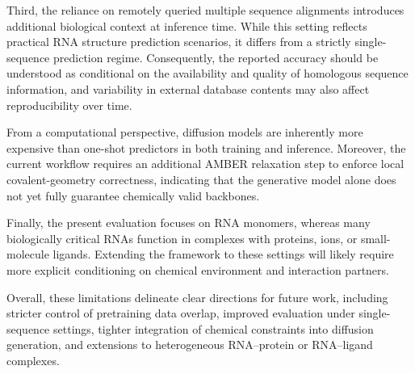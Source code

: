 Third, the reliance on remotely queried multiple sequence alignments introduces additional biological context at inference time. While this setting reflects practical RNA structure prediction scenarios, it differs from a strictly single-sequence prediction regime. Consequently, the reported accuracy should be understood as conditional on the availability and quality of homologous sequence information, and variability in external database contents may also affect reproducibility over time.

From a computational perspective, diffusion models are inherently more expensive than one-shot predictors in both training and inference. Moreover, the current workflow requires an additional AMBER relaxation step to enforce local covalent-geometry correctness, indicating that the generative model alone does not yet fully guarantee chemically valid backbones.

Finally, the present evaluation focuses on RNA monomers, whereas many biologically critical RNAs function in complexes with proteins, ions, or small-molecule ligands. Extending the framework to these settings will likely require more explicit conditioning on chemical environment and interaction partners.

Overall, these limitations delineate clear directions for future work, including stricter control of pretraining data overlap, improved evaluation under single-sequence settings, tighter integration of chemical constraints into diffusion generation, and extensions to heterogeneous RNA–protein or RNA–ligand complexes.
